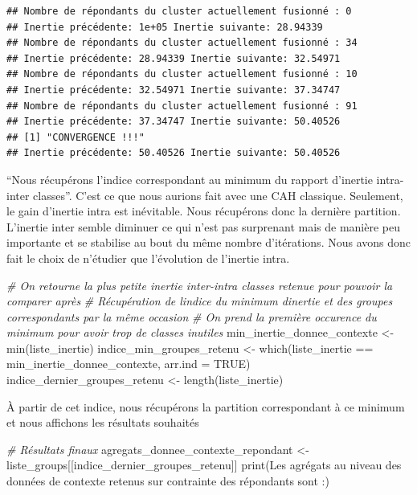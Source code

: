\documentclass[
]{article}
\newenvironment{Shaded}{\begin{snugshade}}{\end{snugshade}}
\newcommand{\AttributeTok}[1]{\textcolor[rgb]{0.77,0.63,0.00}{#1}}
\newcommand{\CommentTok}[1]{\textcolor[rgb]{0.56,0.35,0.01}{\textit{#1}}}
\newcommand{\ConstantTok}[1]{\textcolor[rgb]{0.00,0.00,0.00}{#1}}
\newcommand{\FunctionTok}[1]{\textcolor[rgb]{0.00,0.00,0.00}{#1}}
\newcommand{\NormalTok}[1]{#1}
\newcommand{\OtherTok}[1]{\textcolor[rgb]{0.56,0.35,0.01}{#1}}
\newcommand{\SpecialCharTok}[1]{\textcolor[rgb]{0.00,0.00,0.00}{#1}}
\newcommand{\StringTok}[1]{\textcolor[rgb]{0.31,0.60,0.02}{#1}}
\begin{document}
\begin{verbatim}
## Nombre de répondants du cluster actuellement fusionné : 0 
## Inertie précédente: 1e+05 Inertie suivante: 28.94339 
## Nombre de répondants du cluster actuellement fusionné : 34 
## Inertie précédente: 28.94339 Inertie suivante: 32.54971 
## Nombre de répondants du cluster actuellement fusionné : 10 
## Inertie précédente: 32.54971 Inertie suivante: 37.34747 
## Nombre de répondants du cluster actuellement fusionné : 91 
## Inertie précédente: 37.34747 Inertie suivante: 50.40526 
## [1] "CONVERGENCE !!!"
## Inertie précédente: 50.40526 Inertie suivante: 50.40526
\end{verbatim}

``Nous récupérons l'indice correspondant au minimum du rapport d'inertie
intra-inter classes''. C'est ce que nous aurions fait avec une CAH
classique. Seulement, le gain d'inertie intra est inévitable. Nous
récupérons donc la dernière partition. L'inertie inter semble diminuer
ce qui n'est pas surprenant mais de manière peu importante et se
stabilise au bout du même nombre d'itérations. Nous avons donc fait le
choix de n'étudier que l'évolution de l'inertie intra.

\begin{Shaded}
\begin{Highlighting}[]
\CommentTok{\# On retourne la plus petite inertie inter{-}intra classes retenue pour pouvoir la comparer après}
\CommentTok{\# Récupération de l\textquotesingle{}indice du minimum d\textquotesingle{}inertie et des groupes correspondants par la même occasion}
\CommentTok{\# On prend la première occurence du minimum pour avoir trop de classes inutiles}
\NormalTok{min\_inertie\_donnee\_contexte }\OtherTok{\textless{}{-}} \FunctionTok{min}\NormalTok{(liste\_inertie)}
\NormalTok{indice\_min\_groupes\_retenu }\OtherTok{\textless{}{-}} \FunctionTok{which}\NormalTok{(liste\_inertie }\SpecialCharTok{==}\NormalTok{ min\_inertie\_donnee\_contexte, }\AttributeTok{arr.ind =} \ConstantTok{TRUE}\NormalTok{)}
\NormalTok{indice\_dernier\_groupes\_retenu }\OtherTok{\textless{}{-}} \FunctionTok{length}\NormalTok{(liste\_inertie)}
\end{Highlighting}
\end{Shaded}

À partir de cet indice, nous récupérons la partition correspondant à ce
minimum et nous affichons les résultats souhaités

\begin{Shaded}
\begin{Highlighting}[]
\CommentTok{\# Résultats finaux}
\NormalTok{agregats\_donnee\_contexte\_repondant }\OtherTok{\textless{}{-}}\NormalTok{ liste\_groups[[indice\_dernier\_groupes\_retenu]]}
\FunctionTok{print}\NormalTok{(}\StringTok{\textquotesingle{}Les agrégats au niveau des données de contexte retenus sur contrainte des répondants sont :\textquotesingle{}}\NormalTok{)}
\end{Highlighting}
\end{Shaded}
\end{document}
